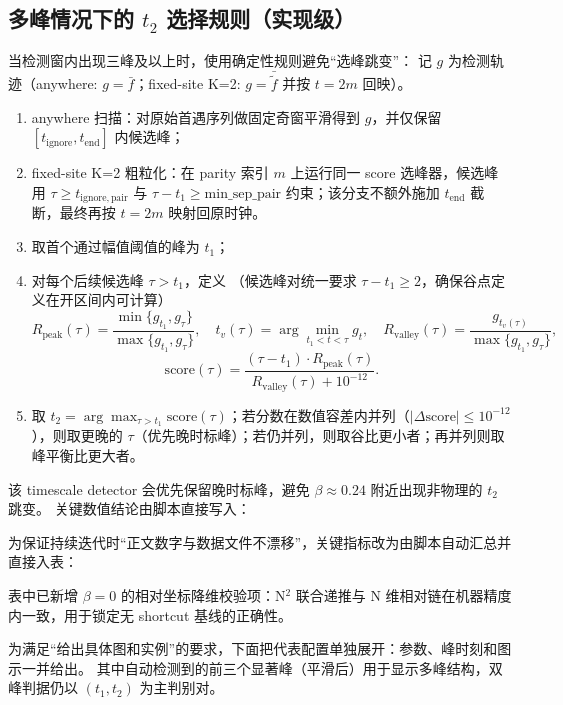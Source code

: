 \documentclass[11pt]{article}
\newcommand{\TabDir}{tables}
\begin{document}
\subsection*{多峰情况下的 \texorpdfstring{$t_2$}{t2} 选择规则（实现级）}
当检测窗内出现三峰及以上时，使用确定性规则避免“选峰跳变”：
记 $g$ 为检测轨迹（anywhere: $g=\bar f$；fixed-site K=2: $g=\bar{\widetilde f}$ 并按 $t=2m$ 回映）。
\begin{enumerate}[leftmargin=1.4em]
  \item anywhere 扫描：对原始首遇序列做固定奇窗平滑得到 $g$，并仅保留 $[t_{\mathrm{ignore}},t_{\mathrm{end}}]$ 内候选峰；
  \item fixed-site K=2 粗粒化：在 parity 索引 $m$ 上运行同一 score 选峰器，候选峰用 $\tau\ge t_{\mathrm{ignore,pair}}$ 与 $\tau-t_1\ge\mathrm{min\_sep\_pair}$ 约束；该分支不额外施加 $t_{\mathrm{end}}$ 截断，最终再按 $t=2m$ 映射回原时钟。
  \item 取首个通过幅值阈值的峰为 $t_1$；
  \item 对每个后续候选峰 $\tau>t_1$，定义
  （候选峰对统一要求 $\tau-t_1\ge2$，确保谷点定义在开区间内可计算）
  \[
  R_{\mathrm{peak}}(\tau)=\frac{\min\{g_{t_1},g_{\tau}\}}{\max\{g_{t_1},g_{\tau}\}},\quad
  t_v(\tau)=\arg\min_{t_1<t<\tau}g_t,\quad
  R_{\mathrm{valley}}(\tau)=\frac{g_{t_v(\tau)}}{\max\{g_{t_1},g_{\tau}\}},
  \]
  \[
  \mathrm{score}(\tau)=
  \frac{(\tau-t_1)\cdot R_{\mathrm{peak}}(\tau)}
  {R_{\mathrm{valley}}(\tau)+10^{-12}}.
  \]
  \item 取 $t_2=\arg\max_{\tau>t_1}\mathrm{score}(\tau)$；若分数在数值容差内并列（$|\Delta\mathrm{score}|\le10^{-12}$），则取更晚的 $\tau$（优先晚时标峰）；若仍并列，则取谷比更小者；再并列则取峰平衡比更大者。
\end{enumerate}
该 timescale detector 会优先保留晚时标峰，避免 $\beta\approx0.24$ 附近出现非物理的 $t_2$ 跳变。
关键数值结论由脚本直接写入：


为保证持续迭代时“正文数字与数据文件不漂移”，关键指标改为由脚本自动汇总并直接入表：

\begin{table}[H]
  \centering
  \caption{1D ring encounter 扫描关键指标（自动生成）。}
  \label{tab:keymetrics}
  
\end{table}
表中已新增 $\beta=0$ 的相对坐标降维校验项：N$^2$ 联合递推与 N 维相对链在机器精度内一致，用于锁定无 shortcut 基线的正确性。

为满足“给出具体图和实例”的要求，下面把代表配置单独展开：参数、峰时刻和图示一并给出。
其中自动检测到的前三个显著峰（平滑后）用于显示多峰结构，双峰判据仍以 $(t_1,t_2)$ 为主判别对。
\end{document}
